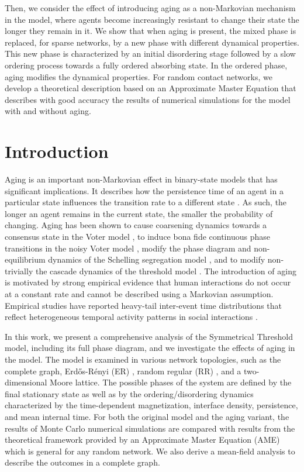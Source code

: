 Then, we consider the effect of introducing aging as a non-Markovian mechanism in the model, where agents become increasingly resistant to change their state the longer they remain in it. We show that when aging is present, the mixed phase is replaced, for sparse networks, by a new phase with different dynamical properties. This new phase is characterized by an initial disordering stage followed by a slow ordering process towards a fully ordered absorbing state. In the ordered phase, aging modifies the dynamical properties. For random contact networks, we develop a theoretical description based on an Approximate Master Equation that describes with good accuracy the results of numerical simulations for the model with and without aging.

\section{\label{sec:Introduction} Introduction}
	
Aging is an important non-Markovian effect in binary-state models that has significant implications. It describes how the persistence time of an agent in a particular state influences the transition rate to a different state \cite{stark-2008, fernandez-gracia-2011, perez-2016, boguna-2014, chen-2020}. As such, the longer an agent remains in the current state, the smaller the probability of changing. Aging has been shown to cause coarsening dynamics towards a consensus state in the Voter model \cite{fernandez-gracia-2011,peralta-2020C}, to induce bona fide continuous phase transitions in the noisy Voter model \cite{artime-2018,peralta-2020A}, modify the phase diagram and non-equilibrium dynamics of the Schelling segregation model \cite{Abella-2022}, and to modify non-trivially the cascade dynamics of the threshold model \cite{Abella-2022-AME}. The introduction of aging is motivated by strong empirical evidence that human interactions do not occur at a constant rate and cannot be described using a Markovian assumption. Empirical studies have reported heavy-tail inter-event time distributions that reflect heterogeneous temporal activity patterns in social interactions \cite{karsai-2011, rybski-2009, zignani-2016, artime-2017, kumar-2020}.
	
In this work, we present a comprehensive analysis of the Symmetrical Threshold model, including its full phase diagram, and we investigate the effects of aging in the model. The model is examined in various network topologies, such as the complete graph, Erd\H{o}s-Rényi (ER)  \cite{erdos1960evolution}, random regular (RR) \cite{wormald1999models}, and a two-dimensional Moore lattice. The possible phases of the system are defined by the final stationary state as well as by the ordering/disordering dynamics characterized by the time-dependent magnetization, interface density, persistence, and mean internal time. For both the original model and the aging variant, the results of Monte Carlo numerical simulations are compared with results from the theoretical framework provided by an Approximate Master Equation (AME)\cite{gleeson-2013,Abella-2022-AME} %
which is general for any random network. We also derive a mean-field analysis to describe the outcomes in a complete graph.
	

